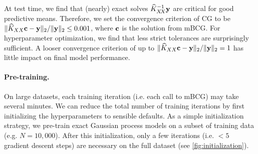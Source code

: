 At test time, we find that (nearly) exact solves $\widehat {K}_{X \! X}^{-1} \mathbf{y}$  are critical for good predictive means.
Therefore, we set the convergence criterion of CG to be $\Vert \widehat{K}_{XX} \mathbf{c} - \mathbf{y} \Vert_2 / \Vert \mathbf{y} \Vert_2 \leq 0.001$, where $\mathbf{c}$ is the solution from mBCG.
For hyperparameter optimization, we find that less strict tolerances are surprisingly sufficient.
A looser convergence criterion of up to $\Vert \widehat{K}_{XX} \mathbf{c} - \mathbf{y} \Vert_2 / \Vert \mathbf{y} \Vert_2 = 1$ has little impact on final model performance.


\paragraph{Pre-training.}
On large datasets, each training iteration (i.e. each call to mBCG) may take several minutes.
We can reduce the total number of training iterations by first initializing the hyperparameters to sensible defaults.
As a simple initialization strategy, we pre-train exact Gaussian process models on a subset of training data (e.g. $N=10,\!000$).
After this initialization, only a few iterations (i.e. $< 5$ gradient descent steps) are necessary on the full dataset (see \cref{fig:initialization}).
